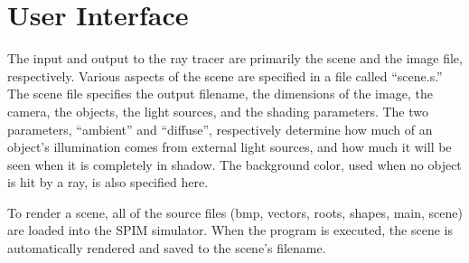 \documentclass[10pt]{article}
\begin{document}
\section{User Interface}


The input and output to the ray tracer are primarily the scene and the
image file, respectively. Various aspects of the scene are specified in
a file called ``scene.s.'' The scene file specifies the output filename,
the dimensions of the image, the camera, the objects, the light sources,
and the shading parameters. The two parameters, ``ambient'' and
``diffuse'', respectively determine how much of an object's illumination
comes from external light sources, and how much it will be seen when it
is completely in shadow. The background color, used when no object is
hit by a ray, is also specified here.

To render a scene, all of the source files (bmp, vectors, roots, shapes,
main, scene) are loaded into the SPIM simulator. When the program is
executed, the scene is automatically rendered and saved to the scene's
filename.
\end{document}
